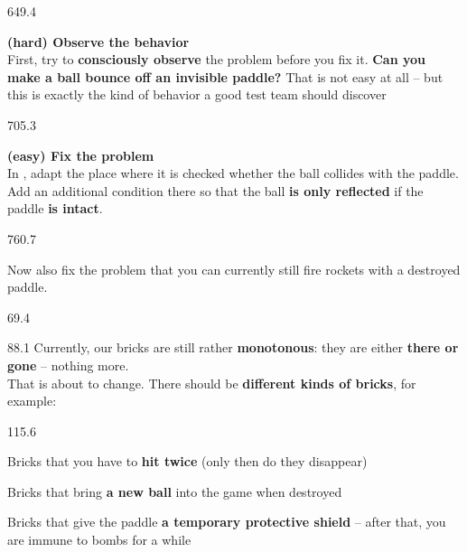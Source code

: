 \documentclass{aslab}
\begin{document}
\begin{region}[x=74.7,right=0,pitch=13.95]{649.4}
\begin{steps}[label=\textbf{(\alph*)}]
\item \textbf{(hard) Observe the behavior}\\
  First, try to \textbf{consciously observe} the problem before you fix it.
  \textbf{Can you make a ball bounce off an invisible paddle?} That is not
  easy at all -- but this is exactly the kind of behavior a good test team
  should discover
\end{steps}
\end{region}

\begin{region}[x=74.7,right=0,pitch=14.0]{705.3}
\begin{steps}[label=\textbf{(\alph*)},start=2]
\item \textbf{(easy) Fix the problem}\\
  In , adapt the place where it is checked whether the ball
  collides with the paddle. Add an additional condition there so that the
  ball \textbf{is only reflected} if the paddle \textbf{is intact}.
\end{steps}
\end{region}

\begin{region}[pitch=13.2]{760.7}
\begin{tasks}[start=3]
\item Now also fix the problem that you can currently still fire rockets
  with a destroyed paddle.
\end{tasks}
\end{region}

\nextpage
\begin{region}{69.4}
\end{region}

\begin{region}[pitch=14.3]{88.1}
Currently, our bricks are still rather \textbf{monotonous}: they are either
\textbf{there or gone} -- nothing more.\\
That is about to change. There should be \textbf{different kinds of bricks},
for example:
\end{region}

\begin{region}[pitch=14.3]{115.6}
\begin{dashlist}
\item Bricks that you have to \textbf{hit twice} (only then do they
  disappear)
\item Bricks that bring \textbf{a new ball} into the game when destroyed
\item Bricks that give the paddle \textbf{a temporary protective shield} --
  after that, you are immune to bombs for a while
\end{dashlist}
\end{region}
\end{document}
